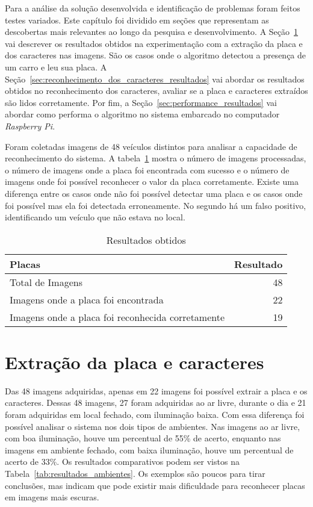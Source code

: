 Para a análise da solução desenvolvida e identificação de problemas foram feitos
testes variados. Este capítulo foi dividido em seções que representam as
descobertas mais relevantes ao longo da pesquisa e desenvolvimento. A
Seção~\ref{sec:extracao_da_placa_resultados} vai descrever os resultados obtidos
na experimentação com a extração da placa e dos caracteres nas imagens. São os casos
onde o algoritmo detectou a presença de um carro e leu sua placa. A
Seção~\ref{sec:reconhecimento_dos_caracteres_resultados} vai abordar os
resultados obtidos no reconhecimento dos caracteres, avaliar se a placa e caracteres
extraídos são lidos corretamente. Por fim, a
Seção~\ref{sec:performance_resultados} vai abordar como performa o algoritmo no
sistema embarcado no computador \emph{Raspberry Pi}.

Foram coletadas imagens de 48 veículos distintos para analisar a capacidade de
reconhecimento do sistema. A tabela~\ref{tab:resultados} mostra o número de
imagens processadas, o número de imagens onde a placa foi encontrada com sucesso
e o número de imagens onde foi possível reconhecer o valor da placa corretamente.
Existe uma diferença entre os casos onde não foi possível detectar uma placa e os
casos onde foi possível mas ela foi detectada erroneamente. No segundo há um falso
positivo, identificando um veículo que não estava no local.

\begin{table}[]
\centering
\caption{Resultados obtidos}
\label{tab:resultados}
\begin{tabular}{@{}lr@{}}
\toprule
Placas                               & \multicolumn{1}{l}{Resultado} \\ \midrule
Total de Imagens                     & 48                           \\
Imagens onde a placa foi encontrada  & 22                            \\
Imagens onde a placa foi reconhecida corretamente & 19
\end{tabular}
\end{table}

\section{Extração da placa e caracteres}
\label{sec:extracao_da_placa_resultados}

Das 48 imagens adquiridas, apenas em 22 imagens foi possível extrair a placa e os caracteres. Dessas 48 imagens, 27 foram adquiridas ao ar livre, durante o dia e 21 foram adquiridas em local fechado, com iluminação baixa. Com essa diferença foi possível analisar o sistema nos dois tipos de ambientes. Nas imagens ao ar livre, com boa iluminação, houve um percentual de 55\% de acerto, enquanto nas imagens em ambiente fechado, com baixa iluminação, houve um percentual de acerto de 33\%. Os resultados comparativos podem ser vistos na Tabela~\ref{tab:resultados_ambientes}. Os exemplos são poucos para tirar conclusões, mas indicam que pode existir mais dificuldade para reconhecer placas em imagens mais escuras.

